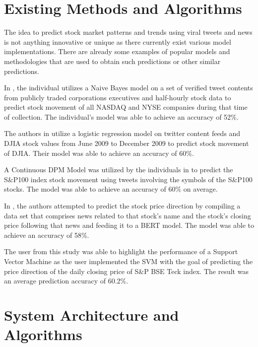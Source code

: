 \documentclass[conference]{IEEEtran}
\begin{document}
\section{Existing Methods and Algorithms}
The idea to predict stock market patterns and trends using viral tweets and news is not anything innovative or unique as there currently exist various model implementations. There are already some examples of popular models and methodologies that are used to obtain such predictions or other similar predictions.

In \cite{b10}, the individual utilizes a Naive Bayes model on a set of verified tweet contents from publicly traded corporations executives and half-hourly stock data to predict stock movement of all NASDAQ and NYSE companies during that time of collection. The individual’s model was able to achieve an accuracy of 52\%.

The authors in \cite{b1} utilize a logistic regression model on twitter content feeds and DJIA stock values from June 2009 to December 2009 to predict stock movement of DJIA. Their model was able to achieve an accuracy of 60\%.

A Continuous DPM Model was utilized by the individuals in \cite{b9} to predict the S\&P100 index stock movement using tweets involving the symbols of the S\&P100 stocks. The model was able to achieve an accuracy of 60\% on average.

In \cite{b14}, the authors attempted to predict the stock price direction by compiling a data set that comprises news related to that stock’s name and the stock’s closing price following that news and feeding it to a BERT model. The model was able to achieve an accuracy of 58\%.

The user from this study \cite{b13} was able to highlight the performance of a Support Vector Machine as the user implemented the SVM with the goal of predicting the price direction of the daily closing price of S\&P BSE Teck index. The result was an average prediction accuracy of 60.2\%. 

\section{System Architecture and Algorithms}
\end{document}
